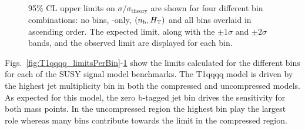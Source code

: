 \begin{figure}[h!]
    \begin{center}
         \\
        \caption{
            95\% CL upper limits on $\sigma/\sigma_{\mathrm{theory}}$ are shown
            for four different bin combinations: no bins, \scalht-only,
            $(n_{\text{b}}, \mbox{$H_\text{T}$})$ and all bins overlaid in ascending order. The
            expected limit, along with the $\pm 1\sigma$ and $\pm 2\sigma$ bands,
            and the observed limit are displayed for each bin.
        }
        \label{fig:T2cc_limitsPerBin}
    \end{center}
\end{figure}


Figs.~\ref{fig:T1qqqq_limitsPerBin}-\ref{fig:T2cc_limitsPerBin} show the limits
calculated for the different bins for each of the SUSY signal model benchmarks.
The T1qqqq model is driven by the highest jet multiplicity bin in both the
compressed and uncompressed models. As expected for this model, the zero
b-tagged jet bin drives the sensitivity for both mass points. In the
uncompressed region the highest \scalht bin play the largest role whereas many
\scalht bins contribute towards the limit in the compressed region.

